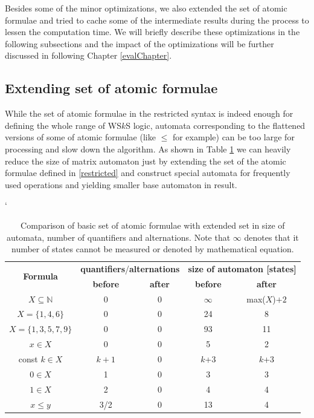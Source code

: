  Besides some of the minor optimizations, we also extended the set of atomic
 formulae and tried to cache some of the intermediate results during the
 process to lessen the computation time. We will briefly describe these
 optimizations in the following subsections and the impact of the optimizations
 will be further discussed in following Chapter \ref{evalChapter}.
 
 \subsection{Extending set of atomic formulae}
 
 While the set of atomic formulae in the restricted syntax is indeed enough for
 defining the whole range of WS$k$S logic, automata corresponding to the
 flattened versions of some of atomic formulae (like $\leq$ for example) can
 be too large for processing and slow down the algorithm. As shown in Table
 \ref{atomic-formulae} we can heavily reduce the size of matrix automaton just
 by extending the set of the atomic formulae defined in \ref{restricted} and
 construct special automata for frequently used operations and yielding smaller
 base automaton in result. 
 
 \begin{table}
  \catcode`
 \begin{center}
  \begin{tabular}{|c|c|c|c|c|}
  \hline  
     \multirow{2}{*}{\textbf{Formula}}          
                    &\multicolumn{2}{c|}{\textbf{quantifiers}/\textbf{alternations}}&\multicolumn{2}{c|}{\textbf{size of automaton [states]}}\\
    \cline{2-5}
     & \textbf{before}     &    \textbf{after}    &
    \textbf{before}     &    \textbf{after}\\
    \hline
    \hline
    $X \subseteq \mathbb{N}$ & 0 & 0 & $\infty$ & max($X$)$ + 2$\\
    \hline
    $X = \{1, 4, 6\}$ & 0 & 0 & 24 & 8\\
    \hline
    $X = \{1, 3, 5, 7, 9\}$ & 0 & 0 & 93 & 11\\
    \hline
    \hline
    $x \in X$ & 0 & 0 & 5 & 2\\
    \hline
    const $k \in X$ & $k+1$ & 0 & $k$+3 & $k$+3\\
    \hline
    $0 \in X$ & 1 & 0 & 3 & 3\\
    \hline
    $1 \in X$ & 2 & 0 & 4 & 4\\
    \hline
    \hline
    $x \leq y$ & 3/2 & 0 & 13 & 4\\
    \hline
  \end{tabular}
 \end{center}
 \caption{Comparison of basic set of atomic formulae with extended set in size
 of automata, number of quantifiers and alternations. Note that $\infty$
 denotes that it number of states cannot be measured or denoted by mathematical
 equation.}\label{atomic-formulae}
 \end{table}
 
